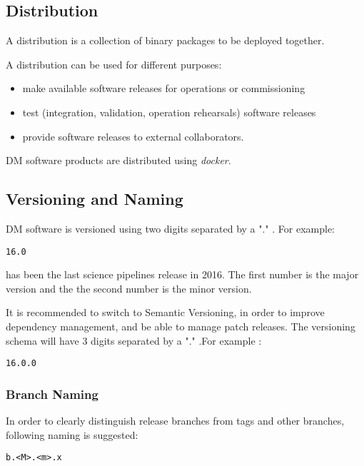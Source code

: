 \subsection{Distribution} \label{sec:distribution}

A distribution is a collection of binary packages to be deployed together.

A distribution can be used for different purposes:

\begin{itemize}
\item make available software releases for operations or commissioning
\item test (integration, validation, operation rehearsals) software releases
\item provide software releases to external collaborators.
\end{itemize}

DM software products are distributed using \textit{docker}.


\newpage
\subsection{Versioning and Naming} \label{sec:versioning}

DM software is versioned using two digits separated by a "." .
For example:

\begin{verbatim}
16.0
\end{verbatim}

has been the last science pipelines release in 2016. The first number is the major version and the the second number is the minor version.


It is recommended to switch to Semantic Versioning, in order to improve dependency management, and be able to manage patch releases.
The versioning schema will have 3 digits separated by a "." .For example :

\begin{verbatim}
16.0.0
\end{verbatim}



\subsubsection{Branch Naming}

In order to clearly distinguish release branches from tags and other branches, following naming is suggested:

\begin{verbatim}
b.<M>.<m>.x
\end{verbatim}

